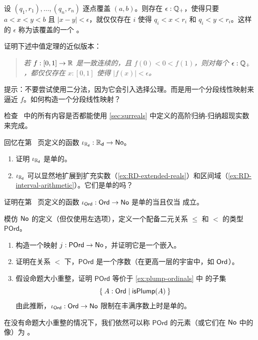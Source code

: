 \begin{ex} \label{ex:finite-cover-lebesgue-number}
  设 $(q_1, r_1), \ldots, (q_n, r_n)$ 逐点覆盖 $(a, b)$。则存在 $\epsilon : \mathbb{Q}_{+}$，使得只要 $a < x < y < b$ 且 $|x - y| < \epsilon$，就仅仅存在 $i$ 使得 $q_i < x < r_i$ 和 $q_i < y < r_i$。这样的 $\epsilon$ 称为该覆盖的一个 
  。%
\end{ex}

\begin{ex} \label{ex:mean-value-theorem}
  证明下述中值定理的近似版本：
  \begin{quote}
    \emph{
      若 $f : [0,1] \to \mathbb{R}$ 是一致连续的，且 $f(0) < 0 < f(1)$，则对每个 $\epsilon : \mathbb{Q}_{+}$，都仅仅存在 $x : [0,1]$ 使得 $|f(x)| < \epsilon$。
    }
  \end{quote}
  提示：不要尝试使用二分法，因为它会引入选择公理。而是用一个分段线性映射来逼近 $f$。如何构造一个分段线性映射？
\end{ex}

\begin{ex}\label{ex:knuth-surreal-check}
  检查~\cite{knuth74:_surreal_number} 中的所有内容是否都能使用 \cref{sec:surreals} 中定义的高阶归纳-归纳超现实数来完成。
\end{ex}

\begin{ex}\label{ex:reals-into-surreals}
  回忆在第~\pageref{reals-into-surreals} 页定义的函数 $\iota_{\mathbb{R}_\mathsf{d}}:\mathbb{R}_\mathsf{d}\to\mathsf{No}$。
  \begin{enumerate}
  \item 证明 $\iota_{\mathbb{R}_\mathsf{d}}$ 是单的。
  \item $\iota_{\mathbb{R}_\mathsf{d}}$ 可以显然地扩展到扩充实数（\cref{ex:RD-extended-reals}）和区间域（\cref{ex:RD-interval-arithmetic}）。它们是单的吗？
  \end{enumerate}
\end{ex}

\begin{ex}\label{ex:ord-into-surreals}
  证明在第~\pageref{ord-into-surreals} 页定义的函数 $\iota_{\mathsf{Ord}}:\mathsf{Ord}\to\mathsf{No}$ 是单的当且仅当 \LEM{} 成立。
\end{ex}

\begin{ex}\label{ex:hiit-plump}
  模仿 $\mathsf{No}$ 的定义（但仅使用左选项），定义一个配备二元关系 $\le$ 和 $<$ 的类型 $\mathsf{POrd}$。
  \begin{enumerate}
  \item 构造一个映射 $j:\mathsf{POrd} \to \mathsf{No}$，并证明它是一个嵌入。
  \item 证明在关系 $<$ 下，$\mathsf{POrd}$ 是一个序数（在更高一层的宇宙中，如 $\mathsf{Ord}$）。
  \item 假设命题大小重整，证明 $\mathsf{POrd}$ 等价于 \cref{ex:plump-ordinals} 中 \ord 的子集 \[\setof{A:\ord | \mathsf{isPlump}(A)}\]由此推断，$\iota_{\mathsf{Ord}}:\mathsf{Ord}\to\mathsf{No}$ 限制在丰满序数上时是单的。
  \end{enumerate}
  在没有命题大小重整的情况下，我们依然可以称 $\mathsf{POrd}$ 的元素（或它们在 $\mathsf{No}$ 中的像）为 。
\end{ex}

